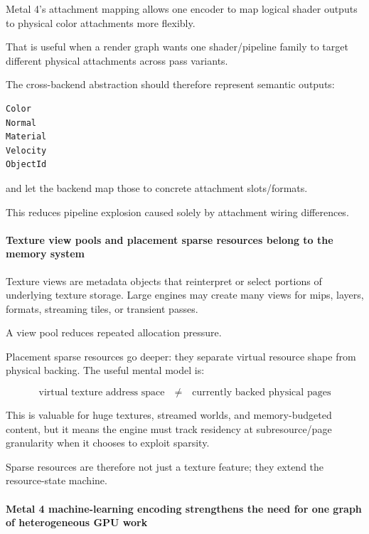 Metal 4's attachment mapping allows one encoder to map logical shader outputs to physical color attachments more flexibly.

That is useful when a render graph wants one shader/pipeline family to target different physical attachments across pass variants.

The cross-backend abstraction should therefore represent semantic outputs:

\begin{verbatim}
Color
Normal
Material
Velocity
ObjectId
\end{verbatim}

and let the backend map those to concrete attachment slots/formats.

This reduces pipeline explosion caused solely by attachment wiring differences.

\paragraph{Texture view pools and placement sparse resources belong to the memory system}\label{texture-view-pools-and-placement-sparse-resources-belong-to-the-memory-system}

Texture views are metadata objects that reinterpret or select portions of underlying texture storage. Large engines may create many views for mips, layers, formats, streaming tiles, or transient passes.

A view pool reduces repeated allocation pressure.

Placement sparse resources go deeper: they separate virtual resource shape from physical backing. The useful mental model is:

\[
\text{virtual texture address space}
\quad\neq\quad
\text{currently backed physical pages}
\]

This is valuable for huge textures, streamed worlds, and memory-budgeted content, but it means the engine must track residency at subresource/page granularity when it chooses to exploit sparsity.

Sparse resources are therefore not just a texture feature; they extend the resource-state machine.

\paragraph{Metal 4 machine-learning encoding strengthens the need for one graph of heterogeneous GPU work}\label{metal-4-machine-learning-encoding-strengthens-the-need-for-one-graph-of-heterogeneous-gpu-work}


